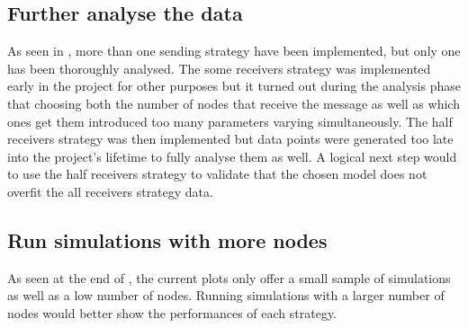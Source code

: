 \subsection{Further analyse the data}
As seen in , more than one sending strategy have been
implemented, but only one has been thoroughly analysed. The some receivers
strategy was implemented early in the project for other purposes but it turned
out during the analysis phase that choosing both the number of nodes that receive
the message as well as which ones get them introduced too many parameters
varying simultaneously. The half receivers strategy was then implemented but data points
were generated too late into the project's lifetime to fully analyse them as
well. A logical next step would to use the half receivers strategy to validate
that the chosen model does not overfit the all receivers strategy data.


\subsection{Run simulations with more nodes}
As seen at the end of , the current plots only offer a
small sample of simulations as well as a low number of nodes. Running
simulations with a larger number of nodes would better show the performances of
each strategy.
